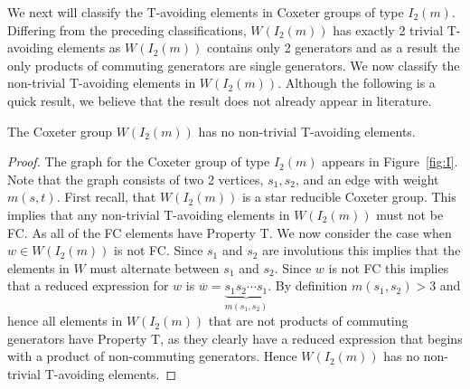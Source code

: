 We next will classify the T-avoiding elements in Coxeter groups of type $I_2(m)$. Differing from the preceding classifications, $W(I_2(m))$ has exactly 2 trivial T-avoiding elements as $W(I_2(m))$ contains only 2 generators and as a result the only products of commuting generators are single generators. We now classify the non-trivial T-avoiding elements in $W(I_2(m))$. Although the following is a quick result, we believe that the result does not already appear in literature.
\begin{theorem}
The Coxeter group $W(I_2(m))$ has no non-trivial T-avoiding elements.
\begin{proof}
	The graph for the Coxeter group of type $I_2(m)$ appears in Figure~\ref{fig:I}. Note that the graph consists of two 2 vertices, $s_1,s_2$, and an edge with weight $m(s,t)$. First recall, that $W(I_2(m))$ is a star reducible Coxeter group. This implies that any non-trivial T-avoiding elements in $W(I_2(m))$ must not be FC. As all of the FC elements have Property T. We now consider the case when $w \in W(I_2(m))$ is not FC. Since $s_1$ and $s_2$ are involutions this implies that the elements in $W$ must alternate between $s_1$ and $s_2$. Since $w$ is not FC this implies that a reduced expression for $w$ is $\overline{w}=\underbrace{s_1s_2 \cdots s_1}_{m(s_1,s_2)}$. By definition $m(s_1,s_2)>3$ and hence all elements in $W(I_2(m))$ that are not products of commuting generators have Property T, as they clearly have a reduced expression that begins with a product of non-commuting generators. Hence $W(I_2(m))$ has no non-trivial T-avoiding elements. 
\end{proof}	
\end{theorem}
 



